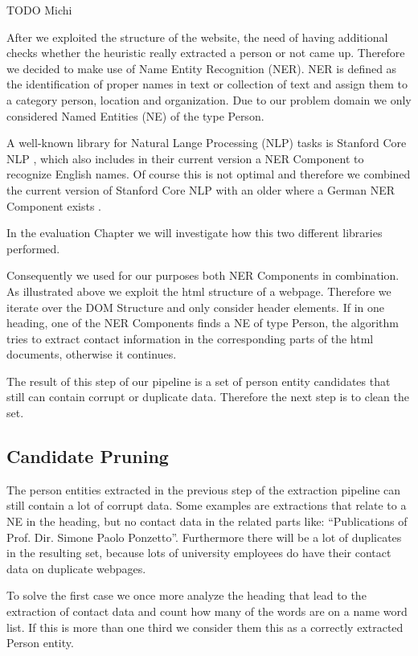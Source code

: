 \documentclass[11pt,titlepage,oneside,openany]{article}
\begin{document}
TODO Michi

After we exploited the structure of the website, the need of having additional checks whether the heuristic really extracted a person or not came up. Therefore we decided to make use of Name Entity Recognition (NER). NER is defined as the identification of proper names in text or collection of text and assign them to a category person, location and organization. Due to our problem domain we only considered Named Entities (NE) of the type Person. 

A well-known library for Natural Lange Processing (NLP) tasks is Stanford Core NLP \cite{manning2014}, which also includes in their current version a NER Component to recognize English names. Of course this is not optimal and therefore we combined the current version of Stanford Core NLP with an older where a German NER Component exists \cite{faruqui10}. 

In the evaluation Chapter we will investigate how this two different libraries performed. 

Consequently we used for our purposes both NER Components in combination. As illustrated above we exploit the html structure of a webpage. Therefore we iterate over the DOM Structure and only consider header elements. If in one heading, one of the NER Components finds a NE of type Person, the algorithm tries to extract contact information in the corresponding parts of the html documents, otherwise it continues.

The result of this step of our pipeline is a set of person entity candidates that still can contain corrupt or duplicate data. Therefore the next step is to clean the set.
\subsection{Candidate Pruning}
The person entities extracted in the previous step of the extraction pipeline can still contain a lot of corrupt data.  Some examples are extractions that relate to a NE in the heading, but no contact data in the related parts like: “Publications of Prof. Dir. Simone Paolo Ponzetto”. Furthermore there will be a lot of duplicates in the resulting set, because lots of university employees do have their contact data on duplicate webpages.

To solve the first case we once more analyze the heading that lead to the extraction of contact data and count how many of the words are on a name word list. If this is more than one third we consider them this as a correctly extracted Person entity. 
\end{document}
